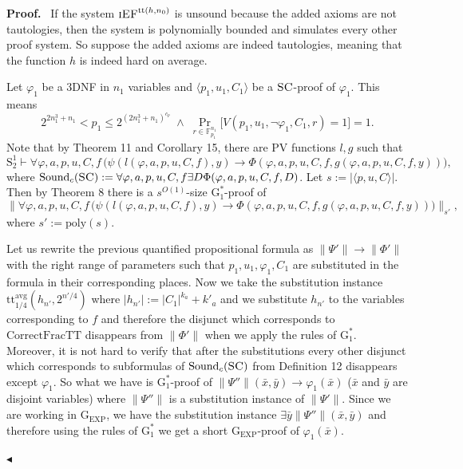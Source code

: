 \documentclass[11pt]{article}
\newcommand{\Stwo}{\mathrm{S}^{1}_{2}}
\newcommand{\SC}{\textsc{SC}}
\newcommand{\iEF}{\textsc{iEF}}
\newcommand{\PV}{\mathrm{PV}}
\newcommand{\GEXP}{\mathrm{G}_{\mathrm{EXP}}}
\newcommand{\Gstar}{\mathrm{G}^{*}_{1}}
\newcommand{\CFTT}{\mathrm{CorrectFracTT}}
\newcommand{\Snd}{\mathrm{Sound}}
\newcommand{\poly}{\mathrm{poly}}
\newcommand{\ttavg}{\mathrm{tt}^{\mathrm{avg}}}
\newcommand{\iEFtt}[1]{\iEF^{\mathrm{tt}(#1)}}
\newenvironment{authorproof}%
  {\par\medskip\noindent\textbf{Proof.}\ \ignorespaces}%
  {\unskip\par\nopagebreak\smallskip\noindent\hfill$\blacktriangleleft$\par\medskip}
\begin{document}
\begin{authorproof}
If the system $\iEFtt{h,n_{0}}$ is unsound because the added axioms are not tautologies, then the
system is polynomially bounded and simulates every other proof system. So suppose the added
axioms are indeed tautologies, meaning that the function $h$ is indeed hard on average.

Let $\varphi_{1}$ be a 3DNF in $n_{1}$ variables and $\langle p_{1},u_{1},C_{1}\rangle$ be a
$\SC$-proof of $\varphi_{1}$. This means
\[
  2^{2n_{1}^{3}+n_{1}} < p_{1} \le 2^{(2n_{1}^{3}+n_{1})^{c_{p}}} \;\wedge\;
  \Pr_{r\in\mathbb{F}_{p_{1}}^{n_{1}}}\bigl[V(p_{1},u_{1},\neg\varphi_{1},C_{1},r) = 1\bigr] = 1.
\]
Note that by Theorem 11 and Corollary 15, there are $\PV$ functions $l,g$ such that
\[
  \Stwo \vdash \forall\varphi,a,p,u,C,f\,
  \bigl(\psi(l(\varphi,a,p,u,C,f),y) \rightarrow
  \Phi(\varphi,a,p,u,C,f,g(\varphi,a,p,u,C,f,y))\bigr),
\]
where $\Snd_{c}(\SC) := \forall\varphi,a,p,u,C,f\exists D\Phi(\varphi,a,p,u,C,f,D)$. Let
$s := |\langle p,u,C\rangle|$. Then by Theorem 8 there is a $s^{O(1)}$-size $\Gstar$-proof of
\[
  \bigl\|\forall\varphi,a,p,u,C,f\,\bigl(\psi(l(\varphi,a,p,u,C,f),y) \rightarrow
  \Phi(\varphi,a,p,u,C,f,g(\varphi,a,p,u,C,f,y))\bigr)\bigr\|_{s'},
\]
where $s' := \poly(s)$.


Let us rewrite the previous quantified propositional formula as
$\|\Psi'\| \rightarrow \|\Phi'\|$ with the right range of parameters such that
$p_{1},u_{1},\varphi_{1},C_{1}$ are substituted in the formula in their corresponding places.
Now we take the substitution instance $\ttavg_{1/4}(h_{n'},2^{n'/4})$ where
$|h_{n'}| := |C_{1}|^{k_{a}} + k'_{a}$ and we substitute $h_{n'}$ to the variables corresponding
to $f$ and therefore the disjunct which corresponds to $\CFTT$ disappears from $\|\Phi'\|$ when
we apply the rules of $\Gstar$. Moreover, it is not hard to verify that after the substitutions
every other disjunct which corresponds to subformulas of $\Snd_{c}(\SC)$ from Definition 12
disappears except $\varphi_{1}$. So what we have is $\Gstar$-proof of
$\|\Psi''\|(\bar{x},\bar{y}) \rightarrow \varphi_{1}(\bar{x})$ ($\bar{x}$ and $\bar{y}$ are
disjoint variables) where $\|\Psi''\|$ is a substitution instance of $\|\Psi'\|$. Since we are
working in $\GEXP$, we have the substitution instance $\exists\bar{y}\|\Psi''\|(\bar{x},\bar{y})$
and therefore using the rules of $\Gstar$ we get a short $\GEXP$-proof of $\varphi_{1}(\bar{x})$.
\end{authorproof}
\end{document}
